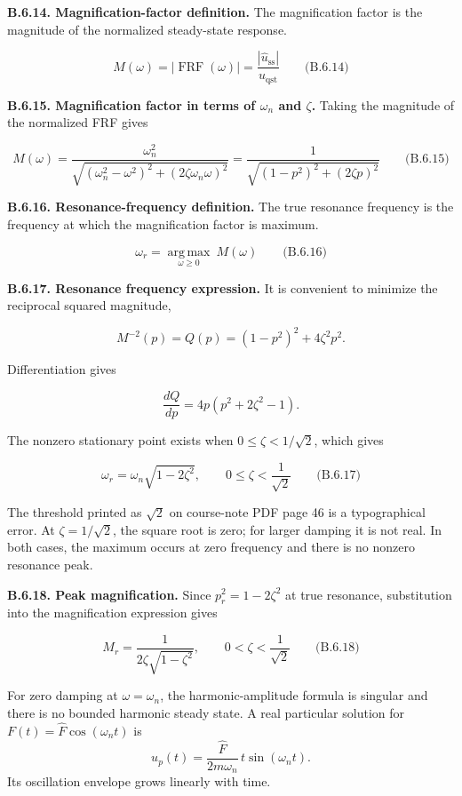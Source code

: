 \textbf{B.6.14. Magnification-factor definition.} The magnification factor is the magnitude of the normalized steady-state response.

\[
\boxed{M(\omega)=\left|\operatorname{FRF}(\omega)\right|
=\frac{|\hat{u}_{\mathrm{ss}}|}{u_{\mathrm{qst}}}}
\qquad\text{(B.6.14)}
\]

\textbf{B.6.15. Magnification factor in terms of $\omega_n$ and $\zeta$.} Taking the magnitude of the normalized FRF gives

\[
\boxed{
M(\omega)=
\frac{\omega_n^2}
{\sqrt{(\omega_n^2-\omega^2)^2+(2\zeta\omega_n\omega)^2}}
=\frac{1}
{\sqrt{(1-p^2)^2+(2\zeta p)^2}}
}
\qquad\text{(B.6.15)}
\]

\textbf{B.6.16. Resonance-frequency definition.} The true resonance frequency is the frequency at which the magnification factor is maximum.

\[
\boxed{\omega_r=\underset{\omega\geq0}{\operatorname{arg\,max}}\ M(\omega)}
\qquad\text{(B.6.16)}
\]

\textbf{B.6.17. Resonance frequency expression.} It is convenient to minimize the reciprocal squared magnitude,

\[
M^{-2}(p)=Q(p)=(1-p^2)^2+4\zeta^2p^2.
\]

Differentiation gives

\[
\frac{dQ}{dp}=4p\left(p^2+2\zeta^2-1\right).
\]

The nonzero stationary point exists when $0\leq\zeta<1/\sqrt{2}$, which gives

\[
\boxed{\omega_r=\omega_n\sqrt{1-2\zeta^2},
\qquad 0\leq\zeta<\frac{1}{\sqrt{2}}}
\qquad\text{(B.6.17)}
\]

The threshold printed as $\sqrt{2}$ on course-note PDF page 46 is a typographical error. At $\zeta=1/\sqrt{2}$, the square root is zero; for larger damping it is not real. In both cases, the maximum occurs at zero frequency and there is no nonzero resonance peak.

\textbf{B.6.18. Peak magnification.} Since $p_r^2=1-2\zeta^2$ at true resonance, substitution into the magnification expression gives

\[
\boxed{M_r=\frac{1}{2\zeta\sqrt{1-\zeta^2}},
\qquad 0<\zeta<\frac{1}{\sqrt{2}}}
\qquad\text{(B.6.18)}
\]

For zero damping at \(\omega=\omega_n\), the harmonic-amplitude formula is singular and there is no bounded harmonic steady state. A real particular solution for \(F(t)=\hat F\cos(\omega_nt)\) is
\[
u_p(t)=\frac{\hat F}{2m\omega_n}\,t\sin(\omega_nt).
\]
Its oscillation envelope grows linearly with time.


